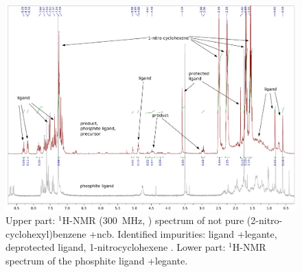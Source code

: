 \begin{landscape}

\ifpdf
\begin{figure}%
 \centering
 \includegraphics[width=1.4\textwidth]{sp/prodotto.pdf}
  \caption{Upper part: $^1$H-NMR (300~MHz, ) spectrum of not pure (2-nitro-cyclo\-hexyl)benzene \cmpd+{ncb}. Identified impurities: ligand \cmpd+{legante}, deprotected ligand, 1-nitro\-cyclo\-hexene . Lower part: $^1$H-NMR spectrum of the phosphite ligand \cmpd+{legante}.\label{sp:prodotto}}
\end{figure}
\else
\fignoeps
\fi
\end{landscape}
